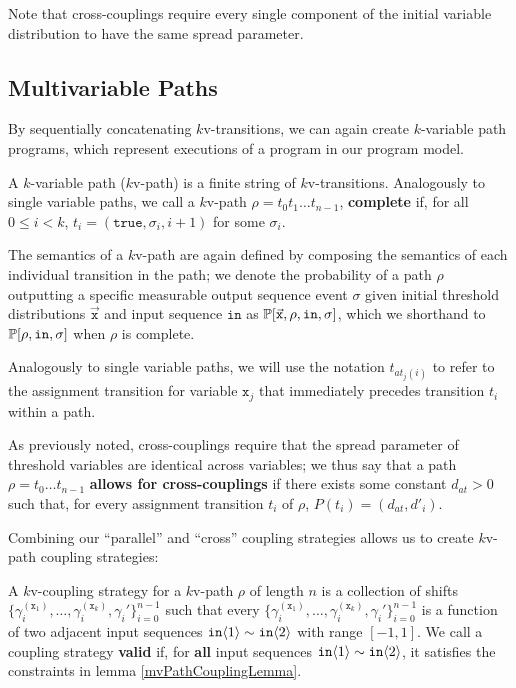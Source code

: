 Note that cross-couplings require every single component of the initial variable distribution to have the same spread parameter.

\subsection{Multivariable Paths}

By sequentially concatenating $k$v-transitions, we can again create $k$-variable path programs, which represent executions of a program in our program model. 

\begin{defn}
    A $k$-variable path ($k$v-path) is a finite string of $k$v-transitions. Analogously to single variable paths, we call a $k$v-path $\rho = t_0t_1\ldots t_{n-1}$, \textbf{complete} if, for all $0\leq i < k$, $t_i = (\texttt{true}, \sigma_i, i+1)$ for some $\sigma_i$.
\end{defn}

The semantics of a $k$v-path are again defined by composing the semantics of each individual transition in the path; we denote the probability of a path $\rho$ outputting a specific measurable output sequence event $\sigma$ given initial threshold distributions $\vec{\texttt{x}}$ and input sequence $\texttt{in}$ as $\mathbb{P}[\vec{\texttt{x}}, \rho, \texttt{in}, \sigma]$, which we shorthand to $\mathbb{P}[\rho, \texttt{in}, \sigma]$ when $\rho$ is complete.

Analogously to single variable paths, we will use the notation $t_{at_j(i)}$ to refer to the assignment transition for variable $\texttt{x}_j$ that immediately precedes transition $t_i$ within a path. 

As previously noted, cross-couplings require that the spread parameter of threshold variables are identical across variables; we thus say that a path $\rho = t_0\ldots t_{n-1}$ \textbf{allows for cross-couplings} if there exists some constant $d_{at}>0$ such that, for every assignment transition $t_i$ of $\rho$, $P(t_i) = (d_{at}, d'_i)$. 


Combining our ``parallel'' and ``cross'' coupling strategies allows us to create $k$v-path coupling strategies:

\begin{defn}
    A $k$v-coupling strategy for a $k$v-path $\rho$ of length $n$ is a collection of shifts $\{\gamma_i^{(\texttt{x}_1)},\ldots, \gamma_i^{(\texttt{x}_k)}, \gamma_i'\}_{i=0}^{n-1}$ such that every $\{\gamma_i^{(\texttt{x}_1)},\ldots, \gamma_i^{(\texttt{x}_k)}, \gamma_i'\}_{i=0}^{n-1}$ is a function of two adjacent input sequences $\texttt{in}\langle1 \rangle\sim \texttt{in}\langle2 \rangle$ with range $[-1, 1]$. 
    We call a coupling strategy \textbf{valid} if, for \textbf{all} input sequences $\texttt{in}\langle1 \rangle\sim\texttt{in}\langle2 \rangle$, it satisfies the constraints in lemma \ref{mvPathCouplingLemma}.
\end{defn}

